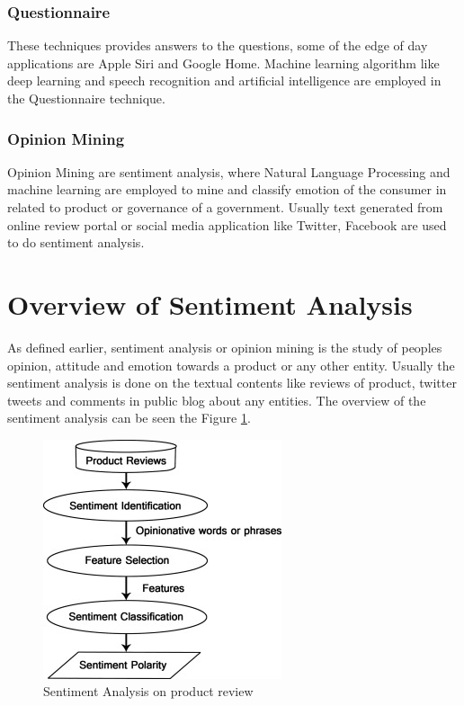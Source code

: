 \documentclass[sigconf]{acmart}
\begin{document}
\subsubsection{Questionnaire}

These techniques provides answers to the questions, some of the edge of day applications are Apple Siri and Google Home\cite{bigdata}. Machine learning algorithm like deep learning and speech recognition and artificial intelligence are employed in the Questionnaire technique.

\subsubsection{Opinion Mining}

Opinion Mining are sentiment analysis, where Natural Language Processing and machine learning are employed to mine and classify emotion of the consumer in related to product or governance of a government. Usually text generated from online review portal or social media application like Twitter, Facebook are used to do sentiment analysis.


\section{Overview of Sentiment Analysis}

As defined earlier, sentiment analysis or opinion mining is the study of peoples opinion, attitude and emotion towards a product or any other entity. Usually the sentiment analysis is done on the textual contents like reviews of product, twitter tweets and comments in public blog about any entities. The overview of the sentiment analysis can be seen the Figure \ref{f:SA}.

\begin{figure}[!ht]
  \centering\includegraphics[width=\columnwidth]{images/sa.jpg}
  \caption{Sentiment Analysis on product review \cite{sentianalysis}}\label{f:SA}
\end{figure}
\end{document}
